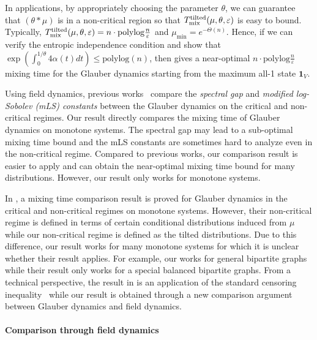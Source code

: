 \documentclass[11pt,a4paper]{article}
\renewcommand{\epsilon}{\varepsilon}
\newcommand{\mixtl}{T_{\textnormal{mix}}^{\textnormal{tilted}}}
\theoremstyle{definition}
\newcommand{\tuple}[1]{\left(#1\right)} \newcommand{\eps}{\varepsilon}
\newcommand{\tp}{\tuple}
\def\*#1{\mathbf{#1}} %
\begin{document}
In applications, by appropriately choosing the parameter $\theta$, we can guarantee that $(\theta * \mu)$ is in a non-critical region so that  $\mixtl(\mu,\theta,\epsilon)$ is easy to bound. Typically, $\mixtl(\mu,\theta,\epsilon) = n \cdot \mathrm{polylog}\frac{n}{\epsilon}$ and $\mu_{\min} = e^{-\Theta(n)}$. Hence, if we can verify the entropic independence condition and show that $\exp \tp{\int_{0}^{1/\theta}4\alpha(t)dt } \leq \mathrm{polylog}(n)$, then  gives a near-optimal $n \cdot \mathrm{polylog}\frac{n}{\epsilon}$ mixing time for the Glauber dynamics starting from the maximum all-1 state $\*1_V$.

Using field dynamics, previous works~\cite{CFYZ21,CFYZ22,ChenE22} compare the \emph{spectral gap} and \emph{modified log-Sobolev (mLS) constants} between the Glauber dynamics on the critical and non-critical regimes.
Our result  directly compares the mixing time of Glauber dynamics on monotone systems. 
The spectral gap may lead to a sub-optimal mixing time bound and the mLS constants are sometimes hard to analyze even in the non-critical regime.
Compared to previous works, our comparison result is easier to apply and can obtain the near-optimal mixing time bound for many distributions. However, our result only works for monotone systems.


In \cite{chenfeng2024rapid}, a mixing time comparison result is proved for Glauber dynamics in the critical and non-critical regimes on monotone systems. 
However, their non-critical regime is defined in terms of certain conditional distributions induced from $\mu$ while our non-critical regime is defined as the tilted distributions.
%
Due to this difference, our result works for many monotone systems for which it is unclear whether their result applies.
For example, our  works for general bipartite graphs while their result only works for a special balanced bipartite graphs.
From a technical perspective, the result in \cite{chenfeng2024rapid} is an application of the standard censoring inequality~\cite{peres2013can} while our result is obtained through a new comparison argument between Glauber dynamics and field dynamics.






\paragraph{Comparison through field dynamics}
\end{document}
